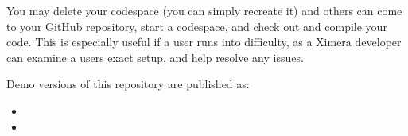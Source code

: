 \documentclass{ximera}
\begin{document}
        You may delete your codespace (you can simply recreate it) and others
        can come
        to your GitHub repository, start a codespace, and check out and compile
        your
        code.
        This is especially useful if a user runs into difficulty, as a Ximera
        developer
        can examine a users exact setup, and help resolve any issues.

        Demo versions of this repository are published as:
        \begin{itemize}
            \item {}
            \item {}
        \end{itemize}

        \pdfOnly{\end{multicols}}
\pdfOnly{\twocolumn}
\end{document}
